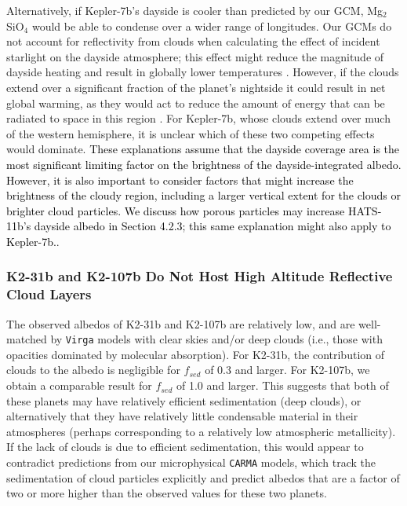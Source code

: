 \documentclass[twocolumn]{aastex63}
\begin{document}
Alternatively, if Kepler-7b's dayside is cooler than predicted by our GCM, Mg$_2$SiO$_4$ would be able to condense over a wider range of longitudes. Our GCMs do not account for reflectivity from clouds when calculating the effect of incident starlight on the dayside atmosphere; this effect might reduce the magnitude of dayside heating and result in globally lower temperatures \citep{lines2018,roman2019,roman2021}. However, if the clouds extend over a significant fraction of the planet's nightside it could result in net global warming, as they would act to reduce the amount of energy that can be radiated to space in this region \citep{roman2019,roman2021,parmentier2021}.  For Kepler-7b, whose clouds extend over much of the western hemisphere, it is unclear which of these two competing effects would dominate. 
\textcolor{black}{These explanations assume that the dayside coverage area is the most significant limiting factor on the brightness of the dayside-integrated albedo. However, it is also important to consider factors that might increase the brightness of the cloudy region, including a larger vertical extent for the clouds or brighter cloud particles. We discuss how porous particles may increase HATS-11b’s dayside albedo in Section 4.2.3; this same explanation might also apply to Kepler-7b.}. 

\subsubsection{K2-31b and K2-107b Do Not Host High Altitude Reflective Cloud Layers}

The observed albedos of K2-31b and K2-107b are relatively low, and are well-matched by \texttt{Virga} models with clear skies and/or deep clouds (i.e., those with opacities dominated by molecular absorption). For K2-31b, the contribution of clouds to the albedo is negligible for $f_{sed}$ of 0.3 and larger.  For K2-107b, we obtain a comparable result for $f_{sed}$ of 1.0 and larger.  This suggests that both of these planets may have relatively efficient sedimentation (deep clouds), or alternatively that they have relatively little condensable material in their atmospheres (perhaps corresponding to a relatively low atmospheric metallicity). If the lack of clouds is due to efficient sedimentation, this would appear to contradict predictions from our microphysical \texttt{CARMA} models, which track the sedimentation of cloud particles explicitly and predict albedos that are a factor of two or more higher than the observed values for these two planets.  
\end{document}
